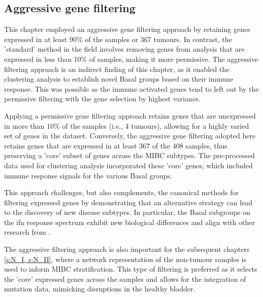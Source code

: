 

\subsection*{Aggressive gene filtering}

This chapter employed an aggressive gene filtering approach by retaining genes expressed in at least 90\% of the samples or 367 tumours. In contrast, the 'standard' method in the field involves removing genes from analysis that are expressed in less than 10\% of samples, making it more permissive. The aggressive filtering approach is an indirect finding of this chapter, as it enabled the clustering analysis to establish novel Basal groups based on their immune response. This was possible as the immune activated genes tend to left out by the permissive filtering with the gene selection by highest variance. 

Applying a permissive gene filtering approach retains genes that are unexpressed in more than 10\% of the samples (i.e., 4 tumours), allowing for a highly varied set of genes in the dataset. Conversely, the aggressive gene filtering adopted here retains genes that are expressed in at least 367 of the 408 samples, thus preserving a 'core' subset of genes across the MIBC subtypes. The pre-processed data used for clustering analysis incorporated these 'core' genes, which included immune response signals for the various Basal groups.

This approach challenges, but also complements, the canonical methods for filtering expressed genes by demonstrating that an alternative strategy can lead to the discovery of new disease subtypes. In particular, the Basal subgroups on the \acrshort{ifn} response spectrum exhibit new biological differences and align with other research from \citep{Marzouka2018-ge,Baker2022-bj}.

The aggressive filtering approach is also important for the subsequent chapters \cref{s:N_I, s:N_II}, where a network representation of the non-tumour samples is used to inform MIBC stratification. This type of filtering is preferred as it selects the 'core' expressed genes across the samples and allows for the integration of mutation data, mimicking disruptions in the healthy bladder.



